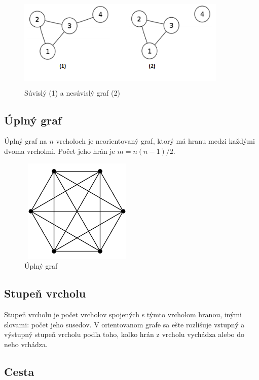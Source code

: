 \documentclass[slovak,master,public,dept460,male,cpdeclaration,oneside]{diploma}
\begin{document}
\begin{figure}[H]
\centering
\includegraphics[width=10cm,height=4.5cm]{figures/suvisly_vs_nesuvisly}
\caption{Súvislý (1) a nesúvislý graf (2)}
\end{figure}


\subsection{Úplný graf}

Úplný graf na ${n}$ vrcholoch je neorientovaný graf, ktorý má hranu medzi každými dvoma vrcholmi. Počet jeho hrán je ${m = n ( n - 1) / 2}$.

\begin{figure}[H]
\centering
\includegraphics[width=5.5cm,height=5cm]{figures/uplnygraf}
\caption{Úplný graf}
\end{figure}


\subsection{Stupeň vrcholu}

Stupeň vrcholu je počet vrcholov spojených s týmto vrcholom hranou, inými slovami: počet jeho susedov. V orientovanom grafe sa ešte rozlišuje vstupný a výstupný stupeň vrcholu podľa toho, koľko hrán z vrcholu vychádza alebo do neho vchádza.

\subsection{Cesta}
\end{document}
